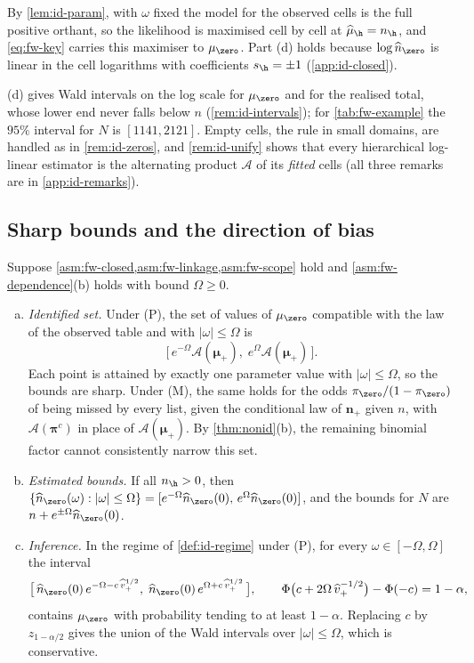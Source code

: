 By \cref{lem:id-param}, with $\omega$ fixed the model for the observed cells is the full positive orthant, so the likelihood is maximised cell by cell at $\widehat\mu_{\h}=n_{\h}$, and \eqref{eq:fw-key} carries this maximiser to $\mu_{\zero}$. Part (d) holds because $\log\widehat n_{\zero}$ is linear in the cell logarithms with coefficients $s_{\h}=\pm1$ (\cref{app:id-closed}).

(d) gives Wald intervals on the log scale for $\mu_{\zero}$ and for the realised total, whose lower end never falls below $n$ (\cref{rem:id-intervals}); for \cref{tab:fw-example} the $95\%$ interval for $N$ is $[1141,2121]$. Empty cells, the rule in small domains, are handled as in \cref{rem:id-zeros}, and \cref{rem:id-unify} shows that every hierarchical log-linear estimator is the alternating product $\mathcal A$ of its \emph{fitted} cells (all three remarks are in \cref{app:id-remarks}).

\subsection{Sharp bounds and the direction of bias}\label{sec:id-bounds}

\begin{corollary}\label{cor:bounds}
Suppose \cref{asm:fw-closed,asm:fw-linkage,asm:fw-scope} hold and \cref{asm:fw-dependence}(b) holds with bound $\Omega\ge0$.
\begin{enumerate}[(a)]
  \item \emph{Identified set.} Under (P), the set of values of $\mu_{\zero}$ compatible with the law of the observed table and with $|\omega|\le\Omega$ is
  \[
    \bigl[\,e^{-\Omega}\mathcal A(\bm\mu_+),\;e^{\Omega}\mathcal A(\bm\mu_+)\,\bigr].
  \]
  Each point is attained by exactly one parameter value with $|\omega|\le\Omega$, so the bounds are sharp. Under (M), the same holds for the odds $\pi_{\zero}/(1-\pi_{\zero})$ of being missed by every list, given the conditional law of $\bm n_+$ given $n$, with $\mathcal A(\bm\pi^c)$ in place of $\mathcal A(\bm\mu_+)$. By \cref{thm:nonid}(b), the remaining binomial factor cannot consistently narrow this set.
  \item \emph{Estimated bounds.} If all $n_{\h}>0$, then $\{\widehat n_{\zero}(\omega):|\omega|\le\Omega\}=[e^{-\Omega}\widehat n_{\zero}(0),\,e^{\Omega}\widehat n_{\zero}(0)]$, and the bounds for $N$ are $n+e^{\pm\Omega}\widehat n_{\zero}(0)$.
  \item \emph{Inference.} In the regime of \cref{def:id-regime} under (P), for every $\omega\in[-\Omega,\Omega]$ the interval
  \begin{equation}\label{eq:id-im}
    \bigl[\,\widehat n_{\zero}(0)\,e^{-\Omega-c\,\widehat v_+^{1/2}},\;\widehat n_{\zero}(0)\,e^{\Omega+c\,\widehat v_+^{1/2}}\,\bigr],
    \qquad
    \Phi\bigl(c+2\Omega\,\widehat v_+^{-1/2}\bigr)-\Phi(-c)=1-\alpha,
  \end{equation}
  contains $\mu_{\zero}$ with probability tending to at least $1-\alpha$. Replacing $c$ by $z_{1-\alpha/2}$ gives the union of the Wald intervals over $|\omega|\le\Omega$, which is conservative.
\end{enumerate}
\end{corollary}

